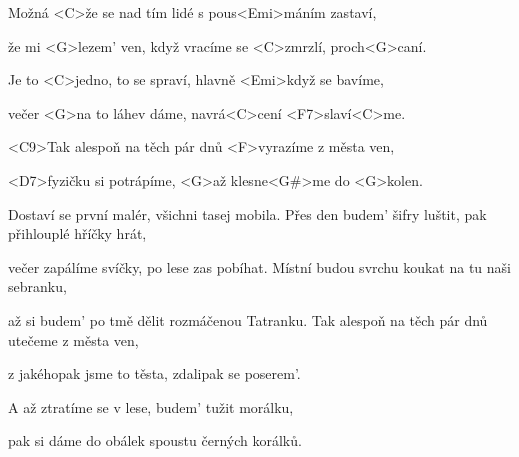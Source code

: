 

\zs

Možná <C>že se nad tím lidé
s pous<Emi>máním zastaví,

že mi <G>lezem' ven, když vracíme se
<C>zmrzlí, proch<G>caní.
\ks

\zs

Je to <C>jedno, to se spraví,
hlavně <Emi>když se bavíme,

večer <G>na to láhev dáme,
navrá<C>cení <F7>slaví<C>me.
\ks

\zr

<C9>Tak alespoň na těch pár dnů
<F>vyrazíme z města ven,

<D7>fyzičku si potrápíme,
<G>až klesne<G#>me do <G>kolen.
\kr

\zs
{}

Dostaví se první malér,
všichni tasej mobila.
\ks
\zs
Přes den budem' šifry luštit,
pak přihlouplé hříčky hrát,

večer zapálíme svíčky,
po lese zas pobíhat.
\ks
\zs
Místní budou svrchu koukat
na tu naši sebranku,

až si budem' po tmě dělit
rozmáčenou Tatranku.
\ks
\zr
Tak alespoň na těch pár dnů
utečeme z města ven,

z jakéhopak jsme to těsta,
zdalipak se poserem'.
\kr

\zs
A až ztratíme se v lese,
budem' tužit morálku,

pak si dáme do obálek
spoustu černých korálků.
\ks

\kp
